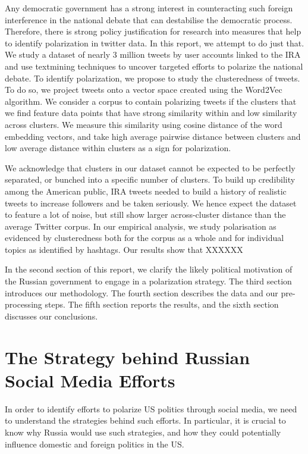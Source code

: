 \documentclass[12pt, authoryear]{elsarticle}
\begin{document}
Any democratic government has a strong interest in counteracting such foreign interference in the national debate that can destabilise the democratic process. Therefore, there is strong policy justification for research into measures that help to identify polarization in twitter data. In this report, we attempt to do just that. We study a dataset of nearly 3 million tweets by user accounts linked to the IRA and use textmining techniques to uncover targeted efforts to polarize the national debate. To identify polarization, we propose to study the clusteredness of tweets. To do so, we project tweets onto a vector space created using the Word2Vec algorithm. We consider a corpus to contain polarizing tweets if the clusters that we find feature data points that have strong similarity within and low similarity across clusters. We measure this similarity using cosine distance of the word embedding vectors, and take high average pairwise distance between clusters and low average distance within clusters as a sign for polarization.

We acknowledge that clusters in our dataset cannot be expected to be perfectly separated, or bunched into a specific number of clusters. To build up credibility among the American public, IRA tweets needed to build a history of realistic tweets to increase followers and be taken seriously. We hence expect the dataset to feature a lot of noise, but still show larger across-cluster distance than the average Twitter corpus. In our empirical analysis, we study polarisation as evidenced by clusteredness both for the corpus as a whole and for individual topics as identified by hashtags. Our results show that XXXXXX

In the second section of this report, we clarify the likely political motivation of the Russian government to engage in a polarization strategy. The third section introduces our methodology. The fourth section describes the data and our pre-processing steps. The fifth section reports the results, and the sixth section discusses our conclusions.

\section{The Strategy behind Russian Social Media Efforts}\label{literature}

In order to identify efforts to polarize US politics through social media, we need to understand the strategies behind such efforts. In particular, it is crucial to know why Russia would use such strategies, and how they could potentially influence domestic and foreign politics in the US. 
\end{document}
